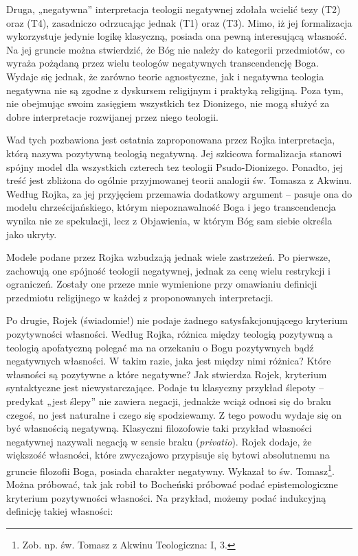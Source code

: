 Druga, „negatywna” interpretacja teologii negatywnej zdołała wcielić
tezy (T2) oraz (T4), zasadniczo odrzucając jednak (T1) oraz (T3). Mimo,
iż jej formalizacja wykorzystuje jedynie logikę klasyczną, posiada ona
pewną interesującą własność. Na jej gruncie można stwierdzić, że Bóg
nie należy do kategorii przedmiotów, co wyraża pożądaną przez wielu
teologów negatywnych transcendencję Boga. Wydaje się jednak, że zarówno
teorie agnostyczne, jak i negatywna teologia negatywna nie są zgodne z
dyskursem religijnym i praktyką religijną. Poza tym, nie obejmując
swoim zasięgiem wszystkich tez Dionizego, nie mogą służyć za dobre
interpretacje rozwijanej przez niego teologii.

Wad tych pozbawiona jest ostatnia zaproponowana przez Rojka
interpretacja, którą nazywa pozytywną teologią negatywną. Jej szkicowa
formalizacja stanowi spójny model dla wszystkich czterech tez teologii
Psudo-Dionizego. Ponadto, jej treść jest zbliżona do ogólnie
przyjmowanej teorii analogii św. Tomasza z Akwinu. Według Rojka, za jej
przyjęciem przemawia dodatkowy argument -- pasuje ona do modelu
chrześcijańskiego, którym niepoznawalność Boga i jego transcendencja
wynika nie ze spekulacji, lecz z Objawienia, w którym Bóg sam siebie
określa jako ukryty.

Modele podane przez Rojka wzbudzają jednak wiele zastrzeżeń. Po
pierwsze, zachowują one spójność teologii negatywnej, jednak za cenę
wielu restrykcji i ograniczeń. Zostały one przeze mnie wymienione przy
omawianiu definicji przedmiotu religijnego w każdej z proponowanych
interpretacji.

Po drugie, Rojek (świadomie!) nie podaje żadnego satysfakcjonującego
kryterium pozytywności własności. Według Rojka, różnica między teologią
pozytywną a teologią apofatyczną polegać ma na orzekaniu o Bogu
pozytywnych bądź negatywnych własności. W takim razie, jaka jest między
nimi różnica? Które własności są pozytywne a które negatywne? Jak
stwierdza Rojek, kryterium syntaktyczne jest niewystarczające. Podaje
tu klasyczny przykład ślepoty -- predykat „jest ślepy” nie zawiera
negacji, jednakże wciąż odnosi się do braku czegoś, no jest naturalne i
czego się spodziewamy. Z tego powodu wydaje się on być własnością
negatywną. Klasyczni filozofowie taki przykład własności negatywnej
nazywali negacją w sensie braku (\textit{privatio}). Rojek dodaje, że
większość własności, które zwyczajowo przypisuje się bytowi absolutnemu
na gruncie filozofii Boga, posiada charakter negatywny. Wykazał to św.
Tomasz\footnote{Zob. np. św. Tomasz z Akwinu Teologiczna: I, 3. }.
Można próbować, tak jak robił to Bocheński próbować podać
epistemologiczne kryterium pozytywności własności. Na przykład, możemy
podać indukcyjną definicję takiej własności:

